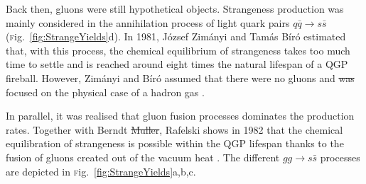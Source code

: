 \documentclass[ALICE,manyauthors]{cernphprep}
\newcommand{\Fig}       {\textsc{f}ig.~}
\newcommand{\fig}       {\Fig}
\providecommand{\DIFaddtex}[1]{{\protect\color{blue}\uwave{#1}}} %
\providecommand{\DIFdeltex}[1]{{\protect\color{red}\sout{#1}}}                      %
\providecommand{\DIFaddbegin}{} %
\providecommand{\DIFaddend}{} %
\providecommand{\DIFdelbegin}{} %
\providecommand{\DIFdelend}{} %
\providecommand{\DIFadd}[1]{\texorpdfstring{\DIFaddtex{#1}}{#1}} %
\providecommand{\DIFdel}[1]{\texorpdfstring{\DIFdeltex{#1}}{}} %
\newcommand{\DIFscaledelfig}{0.5}
\newlength{\DIFdelgraphicswidth} %
\newlength{\DIFdelgraphicsheight} %
\newcommand{\DIFaddincludegraphics}[2][]{{\color{blue}\fbox{\DIFOincludegraphics[#1]{#2}}}} %
\newcommand{\DIFdelincludegraphics}[2][]{%
\sbox{\DIFdelgraphicsbox}{\DIFOincludegraphics[#1]{#2}}%
\settoboxwidth{\DIFdelgraphicswidth}{\DIFdelgraphicsbox} %
\settoboxtotalheight{\DIFdelgraphicsheight}{\DIFdelgraphicsbox} %
\scalebox{\DIFscaledelfig}{%
\parbox[b]{\DIFdelgraphicswidth}{\usebox{\DIFdelgraphicsbox}\\[-\baselineskip] \rule{\DIFdelgraphicswidth}{0em}}\llap{\resizebox{\DIFdelgraphicswidth}{\DIFdelgraphicsheight}{%
\setlength{\unitlength}{\DIFdelgraphicswidth}%
\begin{picture}(1,1)%
\thicklines\linethickness{2pt} %
{\color[rgb]{1,0,0}\put(0,0){\framebox(1,1){}}}%
{\color[rgb]{1,0,0}\put(0,0){\line( 1,1){1}}}%
{\color[rgb]{1,0,0}\put(0,1){\line(1,-1){1}}}%
\end{picture}%
}\hspace*{3pt}}} %
} %
\DeclareRobustCommand{\DIFaddbegin}{\DIFOaddbegin \let\includegraphics\DIFaddincludegraphics} %
\DeclareRobustCommand{\DIFaddend}{\DIFOaddend \let\includegraphics\DIFOincludegraphics} %
\DeclareRobustCommand{\DIFdelbegin}{\DIFOdelbegin \let\includegraphics\DIFdelincludegraphics} %
\DeclareRobustCommand{\DIFdelend}{\DIFOaddend \let\includegraphics\DIFOincludegraphics} %
\begin{document}
Back then, gluons were still hypothetical objects. Strangeness production was mainly considered in the annihilation process of light quark pairs $q\bar{q} \rightarrow s \bar{s}$ (\fig\ref{fig:StrangeYields}d). In 1981, J\'ozsef Zim\'anyi and Tam\'as B\'ir\'o estimated that, with this process, the chemical equilibrium of strangeness takes too much time to settle and is reached around eight times the natural lifespan of a QGP fireball. However, Zim\'anyi and B\'ir\'o assumed that there were no gluons and \DIFdelbegin \DIFdel{was }\DIFdelend \DIFaddbegin \DIFadd{were }\DIFaddend focused on the physical case of a hadron gas \cite{rafelskiStrangenessEnhancement2008}.

In parallel, it was realised that gluon fusion processes dominates the production rates. Together with Berndt \DIFdelbegin \DIFdel{Muller}\DIFdelend \DIFaddbegin \DIFadd{M\"{u}ller}\DIFaddend , Rafelski shows in 1982 that the chemical equilibration of strangeness is possible within the QGP lifespan thanks to the fusion of gluons created out of the vacuum heat  \cite{rafelskiStrangenessProductionQuarkGluon1982}. The different $gg \rightarrow s\bar{s}$ processes are depicted in \fig\ref{fig:StrangeYields}a,b,c.

\DIFaddbegin 
\end{document}
